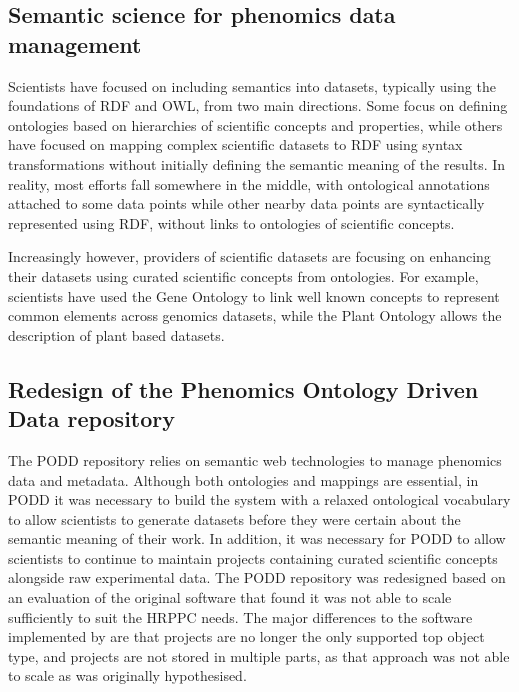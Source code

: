 \documentclass{llncs}
\begin{document}
\subsection{Semantic science for phenomics data management}
Scientists have focused on including semantics into datasets, typically using
the foundations of RDF and OWL, from two main directions. Some focus on defining
ontologies based on hierarchies of scientific concepts and properties, while
others have focused on mapping complex scientific datasets to RDF using syntax
transformations without initially defining the semantic meaning of the results.
In reality, most efforts fall somewhere in the middle, with ontological
annotations attached to some data points while other nearby data points are
syntactically represented using RDF, without links to ontologies of scientific
concepts.


Increasingly however, providers of scientific datasets are focusing on enhancing
their datasets using curated scientific concepts from ontologies. For example,
scientists have used the Gene Ontology \cite{Ashburner2000} to link well known concepts to
represent common elements across genomics datasets, while the Plant Ontology \cite{Avraham2008} 
allows the description of plant based datasets. 


\subsection{Redesign of the Phenomics Ontology Driven Data repository}
The PODD repository relies on semantic web technologies to
manage phenomics data and metadata. Although both ontologies and mappings are
essential, in PODD it was necessary to build the system with a relaxed
ontological vocabulary to allow scientists to generate datasets before they were
certain about the semantic meaning of their work. In addition, it was necessary
for PODD to allow scientists to continue to maintain projects containing curated
scientific concepts alongside raw experimental data. The PODD repository was 
redesigned based on an evaluation of the original software \cite{Li2010} that 
found it was not able to scale sufficiently to suit the HRPPC needs. The 
major differences to the software implemented by \cite{Li2010} are that projects 
are no longer the only supported top object type, and projects are not stored 
in multiple parts, as that approach was not able to scale as was originally hypothesised.
\end{document}
